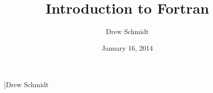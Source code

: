 
\slidesfinal


\newcommand{\tabinlist}[2]{\begin{tabular}{p{1cm}l}#1 & #2 \end{tabular}}
\newcommand{\tabinlisttwo}[2]{\begin{tabular}{p{2.8cm}l}#1 & #2 \end{tabular}}


\utpres


\newcommand{\myauthor}{Drew Schmidt}
\newcommand{\myurl}{}
\newcommand{\myfulltitle}{Introduction to Fortran }
\newcommand{\myabbrvtitle}{Introduction to Fortran }
\newcommand{\mydate}{January 16, 2014}



\title{\myfulltitle}
\newcommand{\mytitlea}{\makebox[.45\paperwidth]{\myabbrvtitle\hfill%
       \insertframenumber/\inserttotalframenumber}}
\newcommand{\mytitleb}{\myabbrvtitle}
\date{\mydate \\[1.4cm] \titlelogos} 
\newcommand{\theauthorgoeshere}{\makebox[.45\paperwidth]{%
  \myurl \hfill \myauthor}}
\author[\theauthorgoeshere]{Drew Schmidt}
















